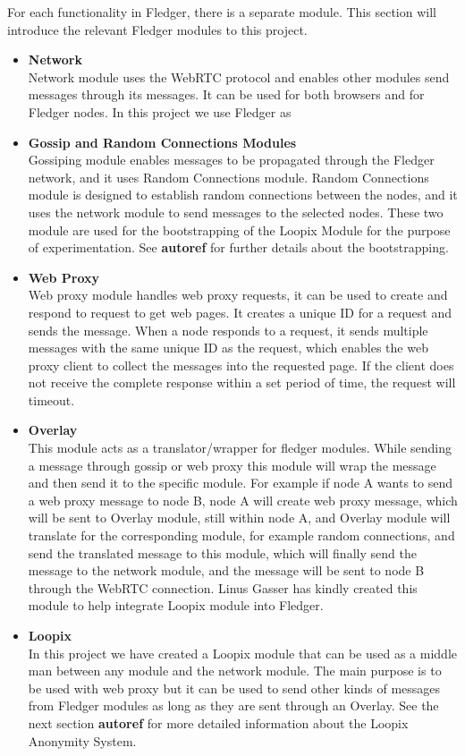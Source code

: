 \documentclass[a4paper,11pt,oneside]{report}
\begin{document}
For each functionality in Fledger, there is a separate module. This section will introduce the relevant Fledger modules to this project.

\begin{itemize}
    \item \textbf{Network} \\
    Network module uses the WebRTC protocol and enables other modules send messages through its messages. It can be used for both browsers and for Fledger nodes. In this project we use Fledger as 
    \item \textbf{Gossip and Random Connections Modules} \\
    Gossiping module enables messages to be propagated through the Fledger network, and it uses Random Connections module. Random Connections module is designed to establish random connections between the nodes, and it uses the network module to send messages to the selected nodes. These two module are used for the bootstrapping of the Loopix Module for the purpose of experimentation. See \textbf{autoref} for further details about the bootstrapping.
    \item \textbf{Web Proxy} \\
    Web proxy module handles web proxy requests, it can be used to create and respond to request to get web pages. It creates a unique ID for a request and sends the message. When a node responds to a request, it sends multiple messages with the same unique ID as the request, which enables the web proxy client to collect the messages into the requested page. If the client does not receive the complete response within a set period of time, the request will timeout.
    \item \textbf{Overlay} \\
    This module acts as a translator/wrapper for fledger modules. While sending a message through gossip or web proxy this module will wrap the message and then send it to the specific module. For example if node A wants to send a web proxy message to node B, node A will create web proxy message, which will be sent to Overlay module, still within node A, and Overlay module will translate for the corresponding module, for example random connections, and send the translated message to this module, which will finally send the message to the network module, and the message will be sent to node B through the WebRTC connection. Linus Gasser has kindly created this module to help integrate Loopix module into Fledger.
    \item \textbf{Loopix} \\
    In this project we have created a Loopix module that can be used as a middle man between any module and the network module. The main purpose is to be used with web proxy but it can be used to send other kinds of messages from Fledger modules as long as they are sent through an Overlay. See the next section \textbf{autoref} for more detailed information about the Loopix Anonymity System. 
\end{itemize}
\end{document}
